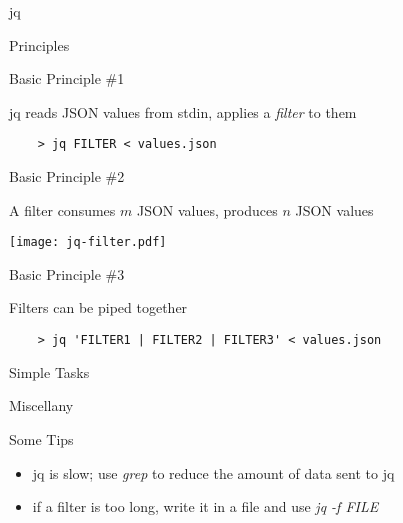 \documentclass{beamer}
\renewcommand\big[1]{
  \begin{center}
    \Large{#1}
  \end{center}
}
\begin{document}
\begin{frame}
  \centering\Huge{jq}
\end{frame}

\begin{frame}
  \centering\Huge{Principles}
\end{frame}

\begin{frame}[fragile]
  \big{Basic Principle \#1}

  \begin{center}
    jq reads JSON values from stdin, applies a \textit{filter} to them
  \end{center}

  \begin{lstlisting}
    > jq FILTER < values.json
  \end{lstlisting}
\end{frame}

\begin{frame}
  \big{Basic Principle \#2}

  \begin{center}
    A filter consumes $m$ JSON values, produces $n$ JSON values
  \end{center}

  \begin{center}
    \texttt{[image: jq-filter.pdf]}
  \end{center}
\end{frame}

\begin{frame}[fragile]
  \big{Basic Principle \#3}

  \begin{center}
    Filters can be piped together
  \end{center}

  \begin{lstlisting}
    > jq 'FILTER1 | FILTER2 | FILTER3' < values.json
  \end{lstlisting}
\end{frame}

\begin{frame}
  \centering\Huge{Simple Tasks}
\end{frame}


\begin{frame}
  \centering\Huge{Miscellany}
\end{frame}

\begin{frame}
  \big{Some Tips}

  \begin{itemize}
    \item jq is slow; use \textit{grep} to reduce the amount of data sent to jq
    \item if a filter is too long, write it in a file and use \textit{jq -f FILE}
  \end{itemize}
\end{frame}
\end{document}
